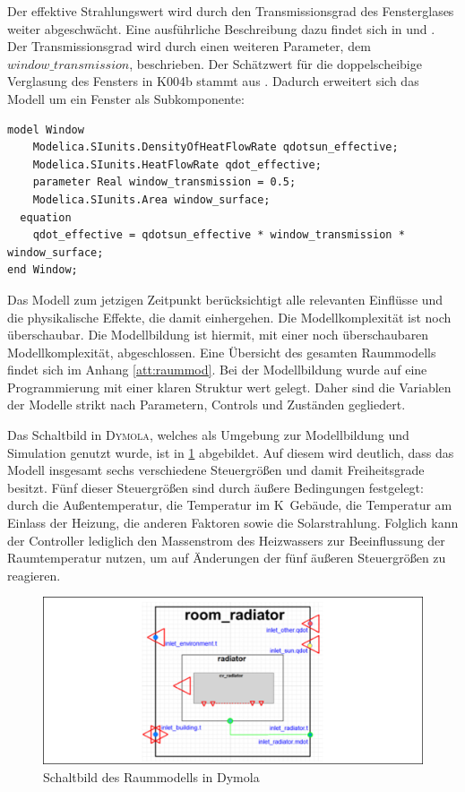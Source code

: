 Der effektive Strahlungswert wird durch den Transmissionsgrad des Fensterglases weiter abgeschwächt. Eine ausführliche Beschreibung dazu findet sich in \cite{ha13} und \cite{ka13}. Der Transmissionsgrad wird durch einen weiteren Parameter, dem $window\_transmission$, beschrieben. Der Schätzwert für die doppelscheibige Verglasung des Fensters in K004b stammt aus \cite[S.~63]{ha13}. Dadurch erweitert sich das Modell um ein Fenster als Subkomponente:

\begin{lstlisting}[language=Modelica, caption={Fenster als Subkomponente des Raummodells},label=lst:raumdrei]
model Window
	Modelica.SIunits.DensityOfHeatFlowRate qdotsun_effective;
	Modelica.SIunits.HeatFlowRate qdot_effective;
	parameter Real window_transmission = 0.5;
	Modelica.SIunits.Area window_surface;
  equation
  	qdot_effective = qdotsun_effective * window_transmission * window_surface;
end Window;
\end{lstlisting}

Das Modell zum jetzigen Zeitpunkt berücksichtigt alle relevanten Einflüsse und die physikalische Effekte, die damit einhergehen. Die Modellkomplexität ist noch überschaubar. Die Modellbildung ist hiermit, mit einer noch überschaubaren Modellkomplexität, abgeschlossen. Eine Übersicht des gesamten Raummodells findet sich im Anhang \ref{att:raummod}. Bei der Modellbildung wurde auf eine Programmierung mit einer klaren Struktur wert gelegt. Daher sind die Variablen der Modelle strikt nach Parametern, Controls und Zuständen gegliedert.

Das Schaltbild in \textsc{Dymola}, welches als Umgebung zur Modellbildung und Simulation genutzt wurde, ist in \ref{fig:raumdym} abgebildet. Auf diesem wird deutlich, dass das Modell insgesamt sechs verschiedene Steuergrößen und damit Freiheitsgrade besitzt. Fünf dieser Steuergrößen sind durch äußere Bedingungen festgelegt: durch die Außentemperatur, die Temperatur im K~Gebäude, die Temperatur am Einlass der Heizung, die anderen Faktoren sowie die Solarstrahlung. Folglich kann der Controller lediglich den Massenstrom des Heizwassers zur Beeinflussung der Raumtemperatur nutzen, um auf Änderungen der fünf äußeren Steuergrößen zu reagieren. 

\begin{figure}
\centering
\includegraphics[width=\textwidth]{abbildungen/20160331_raumdym}
\caption{Schaltbild des Raummodells in Dymola}
\label{fig:raumdym}
\end{figure}

